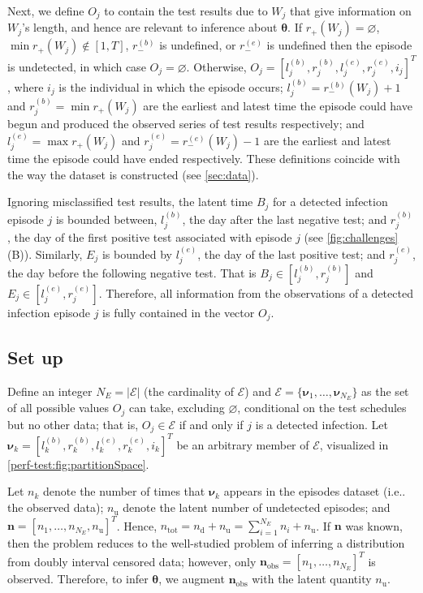 \documentclass[referee,useAMS,usenatbib]{biom}
\makeatletter
\newcommand\set{\mathcal}
\renewcommand{\vec}[1]{\bm{#1}}
\newcommand{\ntot}{n_\text{tot}}
\newcommand{\ndet}{n_\text{d}}
\newcommand{\nnodet}{n_\text{u}}
\newcommand{\na}{\vec{n}_\text{obs}}
\newcommand{\posResults}{r_{+}}
\newcommand{\negResults}{r_{-}}
\DeclareRobustCommand\onedot{\futurelet\@let@token\@onedot}
\def\@onedot{\ifx\@let@token.\else.\null\fi\xspace}
\def\ie{i.e\onedot} \def\Ie{{I.e}\onedot}
\makeatother
\begin{document}
Next, we define $O_j$ to contain the test results due to $W_j$ that give information on $W_j$'s length, and hence are relevant to inference about $\vec{\theta}$.
If $\posResults(W_j) = \varnothing$, $\min \posResults(W_j) \notin [1, T]$, $\negResults^{(b)}$ is undefined, or $\negResults^{(e)}$ is undefined then the episode is undetected, in which case $O_j = \varnothing$.
Otherwise, $O_j = [l_j^{(b)}, r_j^{(b)}, l_j^{(e)}, r_j^{(e)}, i_j]^T$, where $i_j$ is the individual in which the episode occurs; $l_j^{(b)} = \negResults^{(b)}(W_j) + 1$ and $r_j^{(b)} = \min \posResults(W_j)$ are the earliest and latest time the episode could have begun and produced the observed series of test results respectively; and $l_j^{(e)} = \max \posResults(W_j)$ and $r_j^{(e)} = \negResults^{(e)}(W_j) - 1$ are the earliest and latest time the episode could have ended respectively.
These definitions coincide with the way the dataset is constructed (see \cref{sec:data}).

Ignoring misclassified test results, the latent time $B_j$ for a detected infection episode $j$ is bounded between, $l_j^{(b)}$, the day after the last negative test; and $r_j^{(b)}$, the day of the first positive test associated with episode $j$ (see \cref{fig:challenges}(B)).
Similarly, $E_j$ is bounded by $l_j^{(e)}$, the day of the last positive test; and $r_j^{(e)}$, the day before the following negative test.
That is $B_j \in [l_j^{(b)}, r_j^{(b)}]$ and $E_j \in [l_j^{(e)}, r_j^{(e)}]$.
Therefore, all information from the observations of a detected infection episode $j$ is fully contained in the vector $O_j$.

\subsection{Set up} \label{sec:inference}

Define an integer $N_E = |\set{E}|$ (the cardinality of $\set{E}$) and $\set{E} = \{ \vec{\nu}_1, \dots, \vec{\nu}_{N_E} \}$ as the set of all possible values $O_j$ can take, excluding $\varnothing$, conditional on the test schedules but no other data; that is, $O_j \in \set{E}$ if and only if $j$ is a detected infection.
Let $\vec{\nu}_k = [l^{(b)}_k, r^{(b)}_k, l^{(e)}_k, r^{(e)}_k, i_k]^T$ be an arbitrary member of $\set{E}$, visualized in \cref{perf-test:fig:partitionSpace}.

Let $n_k$ denote the number of times that $\vec{\nu}_k$ appears in the episodes dataset (\ie the observed data); $\nnodet$ denote the latent number of undetected episodes; and $\vec{n} = [n_1, \dots, n_{N_E}, \nnodet]^T$.
Hence, $\ntot = \ndet + \nnodet = \sum_{i=1}^{N_E} n_i + \nnodet$.
If $\vec{n}$ was known, then the problem reduces to the well-studied problem of inferring a distribution from doubly interval censored data; however, only $\na = [n_1, \dots, n_{N_E}]^T$ is observed.
Therefore, to infer $\vec\theta$, we augment $\na$ with the latent quantity $\nnodet$.
\end{document}
